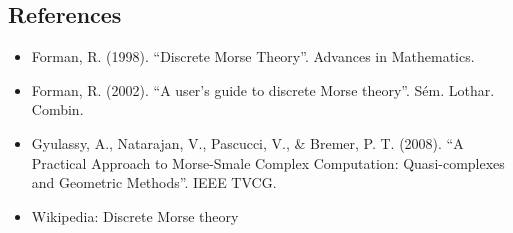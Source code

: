 \subsection{References}
\begin{itemize}
    \item Forman, R. (1998). ``Discrete Morse Theory''. Advances in Mathematics.
    \item Forman, R. (2002). ``A user's guide to discrete Morse theory''. S\'{e}m. Lothar. Combin.
    \item Gyulassy, A., Natarajan, V., Pascucci, V., \& Bremer, P. T. (2008). ``A Practical Approach to Morse-Smale Complex Computation: Quasi-complexes and Geometric Methods''. IEEE TVCG.
    \item Wikipedia: Discrete Morse theory
\end{itemize}
